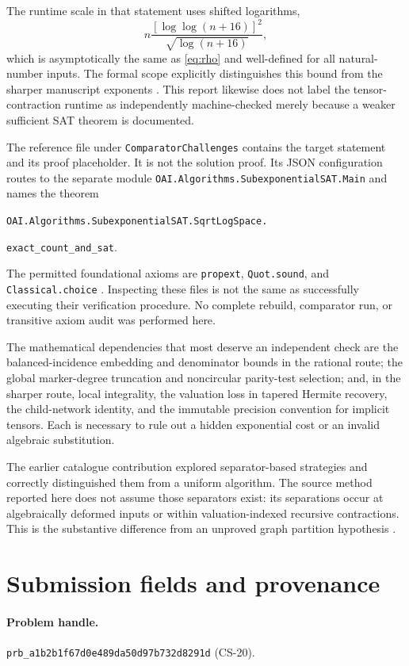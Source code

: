\documentclass[11pt,a4paper]{article}
\numberwithin{equation}{section}
\theoremstyle{definition}
\theoremstyle{remark}
\begin{document}
The runtime scale in that statement uses shifted logarithms,
\[
 n\frac{[\log\log(n+16)]^2}{\sqrt{\log(n+16)}},
\]
which is asymptotically the same as \eqref{eq:rho} and well-defined for all
natural-number inputs. The formal scope explicitly distinguishes this bound
from the sharper manuscript exponents \cite{scope}. This report likewise
does not label the tensor-contraction runtime as independently machine-checked
merely because a weaker sufficient SAT theorem is documented.

The reference file under \texttt{ComparatorChallenges} contains the target
statement and its proof placeholder. It is not the solution proof. Its JSON
configuration routes to the separate module
\texttt{OAI.Algorithms.SubexponentialSAT.Main} and names the theorem
\begin{center}\small
\texttt{OAI.Algorithms.SubexponentialSAT.SqrtLogSpace.}\par
\texttt{exact\_count\_and\_sat}.
\end{center}
The permitted foundational axioms are \texttt{propext}, \texttt{Quot.sound},
and \texttt{Classical.choice} \cite{config,solution}.
Inspecting these files is not the same as successfully executing their
verification procedure. No complete rebuild, comparator run, or transitive
axiom audit was performed here.

The mathematical dependencies that most deserve an independent check are the
balanced-incidence embedding and denominator bounds in the rational route;
the global marker-degree truncation and noncircular parity-test selection;
and, in the sharper route, local integrality, the valuation loss in tapered
Hermite recovery, the child-network identity, and the immutable precision
convention for implicit tensors. Each is necessary to rule out a hidden
exponential cost or an invalid algebraic substitution.

The earlier catalogue contribution explored separator-based strategies and
correctly distinguished them from a uniform algorithm. The source method
reported here does not assume those separators exist: its separations occur
at algebraically deformed inputs or within valuation-indexed recursive
contractions. This is the substantive difference from an unproved graph
partition hypothesis \cite{catalogue}.


\section{Submission fields and provenance}
\paragraph{Problem handle.} \texttt{prb\_a1b2b1f67d0e489da50d97b732d8291d}
(CS-20).
\end{document}
